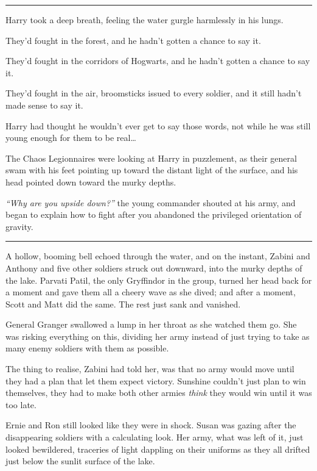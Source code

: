 \begin{center}\rule{3in}{0.4pt}\end{center}

Harry took a deep breath, feeling the water gurgle harmlessly in his
lungs.

They'd fought in the forest, and he hadn't gotten a chance to say it.

They'd fought in the corridors of Hogwarts, and he hadn't gotten a
chance to say it.

They'd fought in the air, broomsticks issued to every soldier, and it
still hadn't made sense to say it.

Harry had thought he wouldn't ever get to say those words, not while he
was still young enough for them to be real\ldots{}

The Chaos Legionnaires were looking at Harry in puzzlement, as their
general swam with his feet pointing up toward the distant light of the
surface, and his head pointed down toward the murky depths.

\emph{``Why are you upside down?''} the young commander shouted at his
army, and began to explain how to fight after you abandoned the
privileged orientation of gravity.

\begin{center}\rule{3in}{0.4pt}\end{center}

A hollow, booming bell echoed through the water, and on the instant,
Zabini and Anthony and five other soldiers struck out downward, into the
murky depths of the lake. Parvati Patil, the only Gryffindor in the
group, turned her head back for a moment and gave them all a cheery wave
as she dived; and after a moment, Scott and Matt did the same. The rest
just sank and vanished.

General Granger swallowed a lump in her throat as she watched them go.
She was risking everything on this, dividing her army instead of just
trying to take as many enemy soldiers with them as possible.

The thing to realise, Zabini had told her, was that no army would move
until they had a plan that let them expect victory. Sunshine couldn't
just plan to win themselves, they had to make both other armies
\emph{think} they would win until it was too late.

Ernie and Ron still looked like they were in shock. Susan was gazing
after the disappearing soldiers with a calculating look. Her army, what
was left of it, just looked bewildered, traceries of light dappling on
their uniforms as they all drifted just below the sunlit surface of the
lake.

